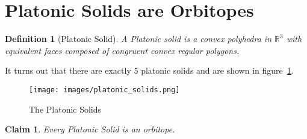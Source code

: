 \documentclass[12]{amsart}
\newtheorem{definition}[theorem]{Definition}
\newtheorem{claim}[theorem]{Claim}
\begin{document}
\section{Platonic Solids are Orbitopes}
\label{sec:platonic_solids}
\begin{definition}[Platonic Solid]
	A \emph{Platonic solid} is a convex polyhedra in $\mathbb{R}^3$ with equivalent faces composed of congruent convex regular polygons.
	\end{definition}
	It turns out that there are exactly $5$ platonic solids and are shown in figure~\ref{fig:platonic_solids}.
\begin{figure}[h!]
	\texttt{[image: images/platonic\_solids.png]}
	\caption{The Platonic Solids}
	\label{fig:platonic_solids}
\end{figure}
\begin{claim}
Every Platonic Solid is an orbitope.
\end{claim}
\end{document}
